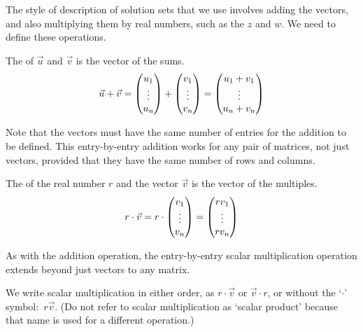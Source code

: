 The style of description of solution sets that we use
involves adding the vectors, and 
also multiplying them by real numbers, such as the \( z \) and $w$.
We need to define these operations.

\begin{definition}
The  of
\( \vec{u} \) and \( \vec{v} \) is the vector of the sums.
\begin{equation*}
  \vec{u}+\vec{v}=
  \begin{pmatrix} u_1 \\ \vdots \\ u_n \end{pmatrix}
   +
  \begin{pmatrix} v_1 \\ \vdots \\ v_n \end{pmatrix}
   =
  \begin{pmatrix} u_1+v_1 \\ \vdots \\ u_n+v_n \end{pmatrix}
\end{equation*}
\end{definition}

Note that the vectors must have the same number of entries for 
the addition to be defined.
This entry-by-entry addition works for any pair of matrices, not just vectors, 
provided that they have the same number of rows and 
columns.

\begin{definition}
The %
 of the real number
\( r \) and the vector \( \vec{v} \) is the vector of the multiples.
\begin{equation*}
  r\cdot\vec{v}=
  r\cdot\begin{pmatrix} v_1 \\ \vdots \\ v_n \end{pmatrix}
  =
  \begin{pmatrix} rv_1 \\ \vdots \\ rv_n \end{pmatrix}
\end{equation*}
\end{definition}

As with the addition operation, the entry-by-entry scalar multiplication
operation extends beyond just vectors to any 
matrix.

We write scalar multiplication in either order, as \( r\cdot\vec{v} \) or
\( \vec{v}\cdot r \), or without the `$\cdot$' symbol:~$r\vec{v}$.
(Do not refer to scalar multiplication 
as `scalar product' because that name is used for a different operation.)

